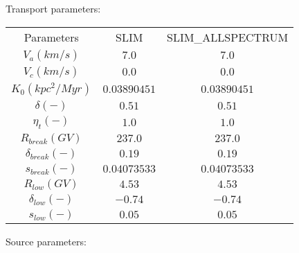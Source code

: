 Transport parameters:

\begin{tabular}{c |c |c}
	Parameters & SLIM &SLIM_ALLSPECTRUM \\ 
	\cline{1-3}
	$V_{a} (km/s)$ & $7.0$ &$7.0$ \\ 
	$V_c (km/s)$ & $0.0$ &$0.0$ \\ 
	$K_0 (kpc^2/Myr)$ & $0.03890451$ &$0.03890451$ \\ 
	$\delta (-)$ & $0.51$ &$0.51$ \\ 
	$\eta_t (-)$ & $1.0$ &$1.0$ \\ 
	$R_{break} (GV)$ & $237.0$ &$237.0$ \\ 
	$\delta_{break} (-)$ & $0.19$ &$0.19$ \\ 
	$s_{break} (-)$ & $0.04073533$ &$0.04073533$ \\ 
	$R_{low} (GV)$ & $4.53$ &$4.53$ \\ 
	$\delta_{low} (-)$ & $-0.74$ &$-0.74$ \\ 
	$s_{low} (-)$ & $0.05$ &$0.05$ \\ 
\end{tabular}

Source parameters:


